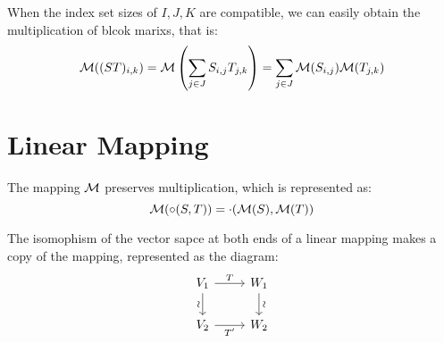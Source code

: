 When the index set sizes of $I, J, K$ are compatible, we can easily obtain the multiplication of blcok marixs, that is:
\begin{equation*}
    {\cal M}((ST)_{i, k}) = {\cal M} \left( \sum_{j \in J} S_{i, j} T_{j, k} \right) = \sum_{j \in J} {\cal M}(S_{i, j}) {\cal M}(T_{j, k})
\end{equation*}







\section{Linear Mapping}

The mapping ${\cal M}$ preserves multiplication, which is represented as:
\begin{equation*}
    {\cal M}(\circ(S, T)) = \cdot({\cal M}(S), {\cal M}(T))
\end{equation*}



The isomophism of the vector sapce at both ends of a linear mapping makes a copy of the mapping, represented as the diagram:
\[
    \begin{tikzcd}
        V_1  \arrow[d, "\sim"', sloped]  \arrow[r, "T"]
        & W_1 \arrow[d, "\sim", sloped]
        \\
        V_2  \arrow[r, "T'"']
        & W_2
    \end{tikzcd}
\]

